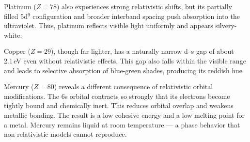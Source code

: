 \begin{figure}[h]
\centering
{}
\end{figure}

Platinum ($Z = 78$) also experiences strong relativistic shifts, but its partially filled 5d$^9$ configuration and broader interband spacing push absorption into the ultraviolet. Thus, platinum reflects visible light uniformly and appears silvery-white.

Copper ($Z = 29$), though far lighter, has a naturally narrow d–s gap of about 2.1 eV even without relativistic effects. This gap also falls within the visible range and leads to selective absorption of blue-green shades, producing its reddish hue.

Mercury ($Z = 80$) reveals a different consequence of relativistic orbital modifications. The 6s orbital contracts so strongly that its electrons become tightly bound and chemically inert. This reduces orbital overlap and weakens metallic bonding. The result is a low cohesive energy and a low melting point for a metal. Mercury remains liquid at room temperature — a phase behavior that non-relativistic models cannot reproduce.

